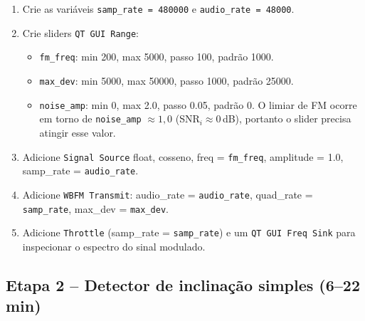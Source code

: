 \documentclass[11pt,a4paper]{article}
\begin{document}
\begin{instrucao}
\begin{enumerate}[label=\arabic*.]
  \item Crie as variáveis \texttt{samp\_rate = 480000} e
    \texttt{audio\_rate = 48000}.
  \item Crie sliders \texttt{QT GUI Range}:
    \begin{itemize}
      \item \texttt{fm\_freq}: min 200, max 5000, passo 100, padrão 1000.
      \item \texttt{max\_dev}: min 5000, max 50000, passo 1000, padrão 25000.
      \item \texttt{noise\_amp}: min 0, max 2.0, passo 0.05, padrão 0.
        O limiar de FM ocorre em torno de \texttt{noise\_amp} $\approx 1{,}0$
        (SNR$_i \approx 0$\,dB), portanto o slider precisa atingir esse valor.
    \end{itemize}
  \item Adicione \texttt{Signal Source} float, cosseno, freq = \texttt{fm\_freq},
    amplitude = 1.0, samp\_rate = \texttt{audio\_rate}.
  \item Adicione \texttt{WBFM Transmit}:
    audio\_rate = \texttt{audio\_rate},
    quad\_rate = \texttt{samp\_rate},
    max\_dev = \texttt{max\_dev}.
  \item Adicione \texttt{Throttle} (samp\_rate = \texttt{samp\_rate}) e um
    \texttt{QT GUI Freq Sink} para inspecionar o espectro do sinal modulado.
\end{enumerate}
\end{instrucao}

\subsection*{Etapa 2 -- Detector de inclinação simples (6--22 min)}
\end{document}
